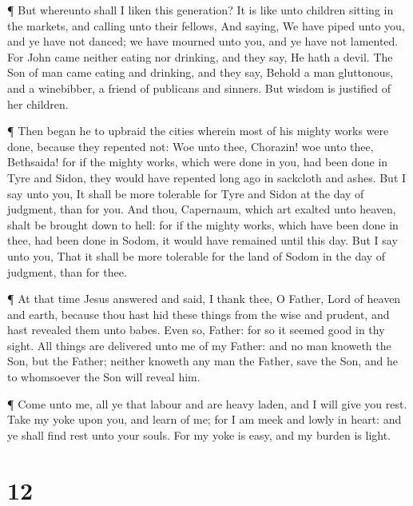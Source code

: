  ¶ But whereunto shall I liken this generation? It is like
unto children sitting in the markets, and calling unto their fellows,
 And saying, We have piped unto you, and ye have not
danced; we have mourned unto you, and ye have not lamented.
 For John came neither eating nor drinking, and they say,
He hath a devil.  The Son of man came eating and drinking,
and they say, Behold a man gluttonous, and a winebibber, a friend of
publicans and sinners. But wisdom is justified of her children.

 ¶ Then began he to upbraid the cities wherein most of his
mighty works were done, because they repented not:  Woe
unto thee, Chorazin! woe unto thee, Bethsaida! for if the mighty works,
which were done in you, had been done in Tyre and Sidon, they would have
repented long ago in sackcloth and ashes.  But I say unto
you, It shall be more tolerable for Tyre and Sidon at the day of
judgment, than for you.  And thou, Capernaum, which art
exalted unto heaven, shalt be brought down to hell: for if the mighty
works, which have been done in thee, had been done in Sodom, it would
have remained until this day.  But I say unto you, That it
shall be more tolerable for the land of Sodom in the day of judgment,
than for thee.

 ¶ At that time Jesus answered and said, I thank thee, O
Father, Lord of heaven and earth, because thou hast hid these things
from the wise and prudent, and hast revealed them unto babes.
 Even so, Father: for so it seemed good in thy sight.
 All things are delivered unto me of my Father: and no man
knoweth the Son, but the Father; neither knoweth any man the Father,
save the Son, and he to whomsoever the Son will reveal him.

 ¶ Come unto me, all ye that labour and are heavy laden,
and I will give you rest.  Take my yoke upon you, and learn
of me; for I am meek and lowly in heart: and ye shall find rest unto
your souls.  For my yoke is easy, and my burden is light.

\hypertarget{section-11}{%
\section{12}\label{section-11}}

